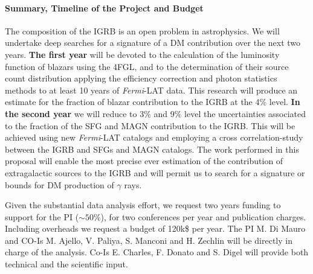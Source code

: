 \documentclass[12 pt]{article}
\newcommand{\FIXME}[1]{{\color{red}{\em Comment: }{#1}}}
\begin{document}
\paragraph{Summary, Timeline of the Project and Budget}
The composition of the IGRB is an open problem in astrophysics.   
We will undertake deep searches for a signature of a DM contribution over the next two years.
{\bf The first year} will be devoted to the calculation of the luminosity function of blazars using the 4FGL, and to the determination of their source count distribution applying the efficiency correction and photon statistics methods to at least 10 years of {\it Fermi}-LAT data.  
This research will produce an estimate for the fraction of blazar contribution to the IGRB at the 4\% level.
{\bf In the second year} we will reduce to 3\% and 9\% level the uncertainties associated to the fraction of the SFG and MAGN contribution to the IGRB. This will be achieved using new {\it Fermi}-LAT catalogs and employing a cross correlation-study between the IGRB and SFGs and MAGN catalogs.
The work performed in this proposal will enable the most precise ever estimation of the contribution of extragalactic sources to the IGRB and will permit us to search for a signature or bounds for DM production of $\gamma$ rays.

Given the substantial data analysis effort, we request two years funding to support for the PI ($\sim 50\%$), for two conferences per year and publication charges. Including overheads we request a budget of 120k\$ per year. 
The PI M. Di Mauro and CO-Is M. Ajello, V. Paliya, S. Manconi and H. Zechlin will be directly in charge of the analysis.%
Co-Is E. Charles, F. Donato and S. Digel will provide both technical and the scientific input.



\vspace{-0.2cm}
{\footnotesize
\begin{multicols}{2}


\end{multicols}}
\end{document}
